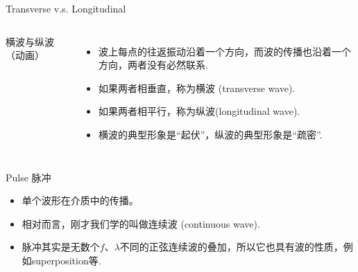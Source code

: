 \documentclass{beamer}
\begin{document}
\begin{frame}{Transverse v.s. Longitudinal}
	\begin{columns}
		\begin{block}{横波与纵波（动画）}
		\begin{center}
		\href{run:./LectureNotePics/trans_longi.gif}{}\\
		\end{center}
		\end{block}
		\begin{itemize}
			\item 波上每点的往返振动沿着一个方向，而波的传播也沿着一个方向，两者没有必然联系.
			\item 如果两者相垂直，称为横波 (transverse wave).
			\item 如果两者相平行，称为纵波(longitudinal wave).
			\item 横波的典型形象是``起伏''，纵波的典型形象是``疏密''.
		\end{itemize}
	\end{columns}
\end{frame}

\begin{frame}{Pulse 脉冲}
	\begin{itemize}
		\item 单个波形在介质中的传播。
		\item 相对而言，刚才我们学的叫做连续波 (continuous wave).
		\item 脉冲其实是无数个$f$、$\lambda$不同的正弦连续波的叠加，所以它也具有波的性质，例如superposition等.
	\end{itemize}
\end{frame}
\end{document}
